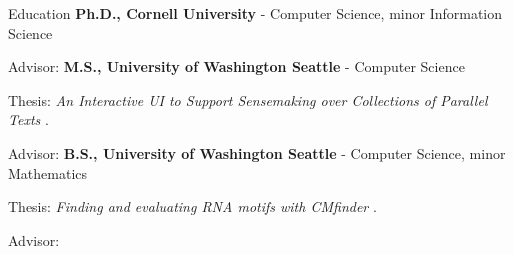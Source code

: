 \begin{rubric}{Education}
	\textbf{Ph.D., Cornell University} - Computer Science, minor Information Science
    \par Advisor: \pJoachimsT{}
\entry*[2019 -- 2021] %
	\textbf{M.S., University of Washington Seattle} - Computer Science
	\par Thesis: \emph{An Interactive UI to Support Sensemaking over Collections of Parallel Texts} \cite{zhou2021thesis}.
    \par Advisor: \pWeldD{}
\entry*[2016 -- 2019] %
	\textbf{B.S., University of Washington Seattle} - Computer Science, minor Mathematics
	\par Thesis: \emph{Finding and evaluating RNA motifs with CMfinder} \cite{zhou2019thesis}.
	\par Advisor: \pRuzzoL{}
\end{rubric}